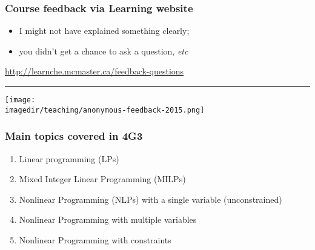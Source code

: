 \begin{frame}\frametitle{Course feedback via Learning website}
	\begin{itemize}
		\item	I might not have explained something clearly;
		\item	you didn't get a chance to ask a question, \emph{etc}
	\end{itemize}
	\href{http://learnche.mcmaster.ca/feedback-questions}{http://learnche.mcmaster.ca/feedback-questions}
	\vspace{12pt}
	\hrule
	\begin{center}
		\texttt{[image: \\imagedir/teaching/anonymous-feedback-2015.png]}
	\end{center}
\end{frame}

\begin{frame}\frametitle{Main topics covered in 4G3}
	\begin{enumerate}
		\item	Linear programming (LPs)
		\item	Mixed Integer Linear Programming (MILPs)
		\item	Nonlinear Programming (NLPs) with a single variable (unconstrained)
		\item	Nonlinear Programming with multiple variables 
		\item	Nonlinear Programming with constraints
	\end{enumerate}
\end{frame}

